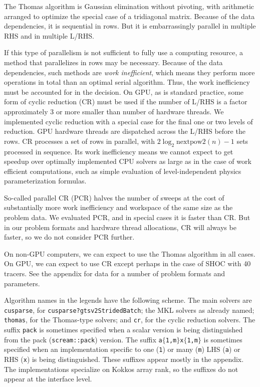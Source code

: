 \documentclass[10pt,twocolumn]{article}
\begin{document}
The Thomas algorithm is Gaussian elimination without pivoting,
with arithmetic arranged to optimize the special case of a tridiagonal matrix.
Because of the data dependencies, it is sequential in rows.
But it is embarrassingly parallel in multiple RHS and in multiple L/RHS.

If this type of parallelism is not sufficient to fully use a computing resource,
a method that parallelizes in rows may be necessary.
Because of the data dependencies, such methods are \emph{work inefficient},
which means they perform more operations in total than an optimal serial algorithm.
Thus, the work inefficiency must be accounted for in the decision.
On GPU, as is standard practice,
some form of cyclic reduction (CR) must be used if the number of L/RHS is a factor
approximately 3 or more smaller than number of hardware threads.
We implemented cyclic reduction with a special case for the final one or two levels of reduction.
GPU hardware threads are dispatched across the L/RHS before the rows.
CR processes a set of rows in parallel, with $2 \log_2 \mathrm{nextpow2}(n) - 1$ sets processed in sequence.
Its work inefficiency means we cannot expect to get speedup over optimally implemented CPU solvers as large as
in the case of work efficient computations, such as simple evaluation of level-independent physics parameterization formulas.

So-called parallel CR (PCR) halves the number of sweeps at the cost of substantially more work inefficiency and workspace of the same size as the problem data.
We evaluated PCR, and in special cases it is faster than CR.
But in our problem formats and hardware thread allocations,
CR will always be faster, so we do not consider PCR further.

On non-GPU computers, we can expect to use the Thomas algorithm in all cases.
On GPU, we can expect to use CR except perhaps in the case of SHOC with 40 tracers.
See the appendix for data for a number of problem formats and parameters.

Algorithm names in the legends have the following scheme.
The main solvers are {\tt cusparse}, for {\tt cusparse?gtsv2StridedBatch};
the MKL solvers as already named;
{\tt thomas}, for the Thomas-type solvers;
and {\tt cr}, for the cyclic reduction solvers.
The suffix {\tt pack} is sometimes specified when a scalar version is being distinguished from the pack ({\tt scream::pack}) version.
The suffix {\tt a$\{$1,m$\}$x$\{$1,m$\}$} is sometimes specified when an implementation specific to one ({\tt 1}) or many ({\tt m}) LHS ({\tt a}) or RHS ({\tt x}) is being distinguished.
These suffixes appear mostly in the appendix.
The implementations specialize on Kokkos array rank, so the suffixes do not appear at the interface level.
\end{document}
